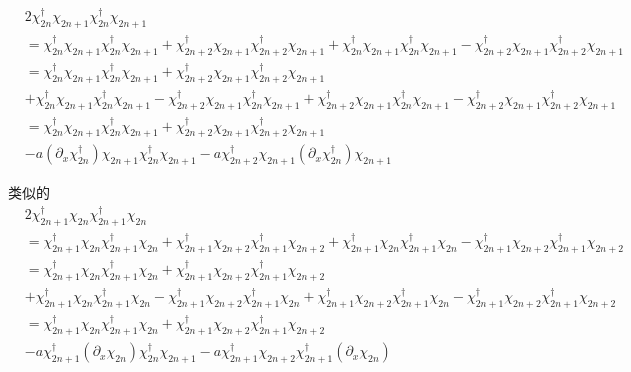 \begin{equation}
\begin{split}
&2\chi ^{\dagger}_{2n}\chi _{2n+1}\chi ^{\dagger}_{2n}\chi _{2n+1}\\
&=\chi ^{\dagger}_{2n}\chi _{2n+1}\chi ^{\dagger}_{2n}\chi _{2n+1}+\chi ^{\dagger}_{2n+2}\chi _{2n+1}\chi ^{\dagger}_{2n+2}\chi _{2n+1}+\chi ^{\dagger}_{2n}\chi _{2n+1}\chi ^{\dagger}_{2n}\chi _{2n+1}-\chi ^{\dagger}_{2n+2}\chi _{2n+1}\chi ^{\dagger}_{2n+2}\chi _{2n+1}\\
&=\chi ^{\dagger}_{2n}\chi _{2n+1}\chi ^{\dagger}_{2n}\chi _{2n+1}+\chi ^{\dagger}_{2n+2}\chi _{2n+1}\chi ^{\dagger}_{2n+2}\chi _{2n+1}\\
&+\chi ^{\dagger}_{2n}\chi _{2n+1}\chi ^{\dagger}_{2n}\chi _{2n+1}-\chi ^{\dagger}_{2n+2}\chi _{2n+1}\chi ^{\dagger}_{2n}\chi _{2n+1}+\chi ^{\dagger}_{2n+2}\chi _{2n+1}\chi ^{\dagger}_{2n}\chi _{2n+1}-\chi ^{\dagger}_{2n+2}\chi _{2n+1}\chi ^{\dagger}_{2n+2}\chi _{2n+1}\\
&=\chi ^{\dagger}_{2n}\chi _{2n+1}\chi ^{\dagger}_{2n}\chi _{2n+1}+\chi ^{\dagger}_{2n+2}\chi _{2n+1}\chi ^{\dagger}_{2n+2}\chi _{2n+1}\\
&-a(\partial _x \chi^{\dagger}_{2n})\chi _{2n+1}\chi ^{\dagger}_{2n}\chi _{2n+1}-a\chi ^{\dagger}_{2n+2}\chi _{2n+1}(\partial _x\chi ^{\dagger}_{2n})\chi _{2n+1}
\end{split}
\end{equation}

类似的
\begin{equation}
\begin{split}
&2\chi ^{\dagger}_{2n+1}\chi _{2n}\chi ^{\dagger}_{2n+1}\chi _{2n}\\
&=\chi ^{\dagger}_{2n+1}\chi _{2n}\chi ^{\dagger}_{2n+1}\chi _{2n}+\chi ^{\dagger}_{2n+1}\chi _{2n+2}\chi ^{\dagger}_{2n+1}\chi _{2n+2}+\chi ^{\dagger}_{2n+1}\chi _{2n}\chi ^{\dagger}_{2n+1}\chi _{2n}-\chi ^{\dagger}_{2n+1}\chi _{2n+2}\chi ^{\dagger}_{2n+1}\chi _{2n+2}\\
&=\chi ^{\dagger}_{2n+1}\chi _{2n}\chi ^{\dagger}_{2n+1}\chi _{2n}+\chi ^{\dagger}_{2n+1}\chi _{2n+2}\chi ^{\dagger}_{2n+1}\chi _{2n+2}\\
&+\chi ^{\dagger}_{2n+1}\chi _{2n}\chi ^{\dagger}_{2n+1}\chi _{2n}-\chi ^{\dagger}_{2n+1}\chi _{2n+2}\chi ^{\dagger}_{2n+1}\chi _{2n}+\chi ^{\dagger}_{2n+1}\chi _{2n+2}\chi ^{\dagger}_{2n+1}\chi _{2n}-\chi ^{\dagger}_{2n+1}\chi _{2n+2}\chi ^{\dagger}_{2n+1}\chi _{2n+2}\\
&=\chi ^{\dagger}_{2n+1}\chi _{2n}\chi ^{\dagger}_{2n+1}\chi _{2n}+\chi ^{\dagger}_{2n+1}\chi _{2n+2}\chi ^{\dagger}_{2n+1}\chi _{2n+2}\\
&-a\chi^{\dagger}_{2n+1}(\partial _x \chi _{2n})\chi ^{\dagger}_{2n}\chi _{2n+1}-a\chi ^{\dagger}_{2n+1}\chi _{2n+2}\chi ^{\dagger}_{2n+1}(\partial _x \chi _{2n})
\end{split}
\end{equation}

